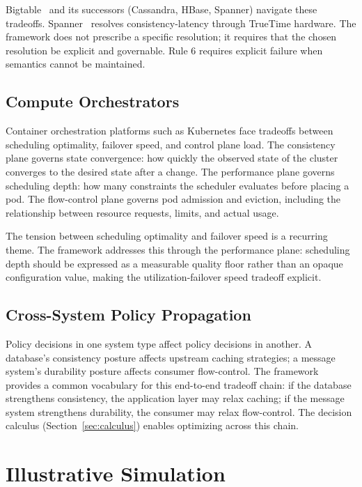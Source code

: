 \documentclass[conference]{IEEEtran}
\begin{document}
Bigtable~\cite{bigtable} and its successors (Cassandra, HBase, Spanner) navigate these tradeoffs. Spanner~\cite{spanner} resolves consistency-latency through TrueTime hardware. The framework does not prescribe a specific resolution; it requires that the chosen resolution be explicit and governable. Rule 6 requires explicit failure when semantics cannot be maintained.

\subsection{Compute Orchestrators}

Container orchestration platforms such as Kubernetes face tradeoffs between scheduling optimality, failover speed, and control plane load. The consistency plane governs state convergence: how quickly the observed state of the cluster converges to the desired state after a change. The performance plane governs scheduling depth: how many constraints the scheduler evaluates before placing a pod. The flow-control plane governs pod admission and eviction, including the relationship between resource requests, limits, and actual usage.

The tension between scheduling optimality and failover speed is a recurring theme. The framework addresses this through the performance plane: scheduling depth should be expressed as a measurable quality floor rather than an opaque configuration value, making the utilization-failover speed tradeoff explicit.

\subsection{Cross-System Policy Propagation}

Policy decisions in one system type affect policy decisions in another. A database's consistency posture affects upstream caching strategies; a message system's durability posture affects consumer flow-control. The framework provides a common vocabulary for this end-to-end tradeoff chain: if the database strengthens consistency, the application layer may relax caching; if the message system strengthens durability, the consumer may relax flow-control. The decision calculus (Section~\ref{sec:calculus}) enables optimizing across this chain.

\section{Illustrative Simulation}
\label{sec:eval}
\end{document}
